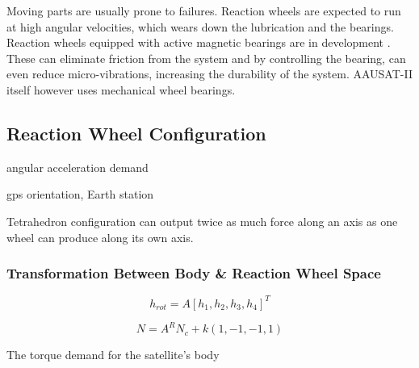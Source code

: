 Moving parts are usually prone to failures. Reaction wheels are expected to run at high angular velocities, which wears down the lubrication and the bearings. Reaction wheels equipped with active magnetic bearings are in development \cite{MagneticReactWheel}. These can eliminate friction from the system and by controlling the bearing, can even reduce micro-vibrations, increasing the durability of the system. AAUSAT-II itself however uses mechanical wheel bearings.

\subsection{Reaction Wheel Configuration}

angular acceleration demand \cite{ReactionWheelConfigSim} \cite{ReactConfigThesis}

gps orientation, Earth station

Tetrahedron configuration can output twice as much force along an axis as one wheel can produce along its own axis.

\subsubsection{Transformation Between Body \& Reaction Wheel Space}

\cite[equation 18.41-42]{SADC}

\begin{equation}
h_{rot} = A\left[ h_1, h_2, h_3, h_4 \right]^T
\end{equation}

\begin{equation}
N = A^R \textbf{$N_c$} + k\left(1,-1,-1,1\right)
\end{equation}


The torque demand for the satellite's body

